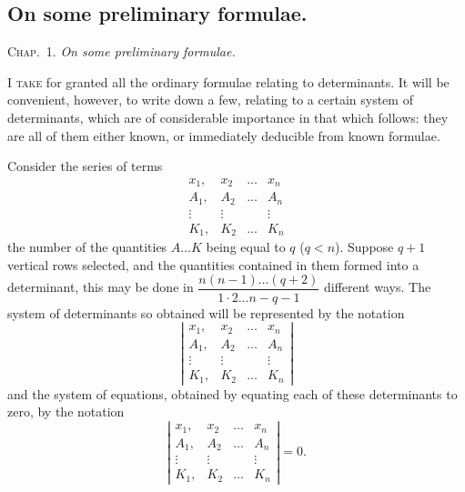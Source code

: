 \documentclass[11pt,a4paper]{book}
\begin{document}
\subsection{On some preliminary formulae.}

\textsc{Chap.\ 1.} \textit{On some preliminary formulae.}

\textsc{I take} for granted all the ordinary formulae relating to determinants. It will be
convenient, however, to write down a few, relating to a certain system of determinants,
which are of considerable importance in that which follows: they are all of them
either known, or immediately deducible from known formulae.

Consider the series of terms
\[
\begin{array}{cccc}
x_1, & x_2 & \ldots & x_n \\
A_1, & A_2 & \ldots & A_n \\
\vdots & \vdots & & \vdots \\
K_1, & K_2 & \ldots & K_n
\end{array}
\tag{1}
\]
the number of the quantities $A \ldots K$ being equal to $q$ ($q < n$). Suppose $q+1$
vertical rows selected, and the quantities contained in them formed into a determinant,
this may be done in $\dfrac{n(n-1) \ldots (q+2)}{1 \cdot 2 \ldots n-q-1}$ different ways. The system of determinants
so obtained will be represented by the notation
\[
\left|
\begin{array}{cccc}
x_1, & x_2 & \ldots & x_n \\
A_1, & A_2 & \ldots & A_n \\
\vdots & \vdots & & \vdots \\
K_1, & K_2 & \ldots & K_n
\end{array}
\right|
\tag{2}
\]
and the system of equations, obtained by equating each of these determinants to zero,
by the notation
\[
\left|
\begin{array}{cccc}
x_1, & x_2 & \ldots & x_n \\
A_1, & A_2 & \ldots & A_n \\
\vdots & \vdots & & \vdots \\
K_1, & K_2 & \ldots & K_n
\end{array}
\right| = 0
\tag{3}.
\]
\end{document}
